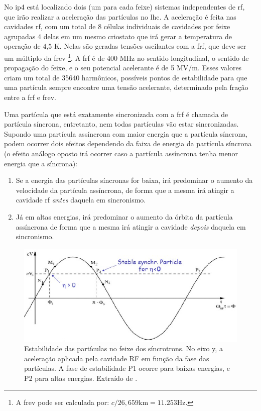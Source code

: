 No \gls{ip}4 está localizado dois (um para cada feixe) sistemas independentes de \gls{rf}, 
que irão realizar a aceleração das partículas no \gls{lhc}. A
aceleração é feita nas cavidades \gls{rf}, com um total de 8 células individuais 
de cavidades por feixe agrupadas 4 delas em um mesmo criostato 
que irá gerar a temperatura de operação de 4,5 K. Nelas são geradas tensões oscilantes
com a \gls{frf}, que deve ser um múltiplo da \gls{frev}
\footnote{A \gls{frev} pode ser calculada por: $c/26,659\text{km}=11.253
\text{Hz}$.}.  A \gls{frf} é de 400 MHz no sentido longitudinal, 
o sentido de propagação do feixe, e o seu potencial acelerante é de 5 MV/m.
Esses valores criam um total de 35640
harmônicos, possíveis pontos de estabilidade para que uma partícula 
sempre encontre uma tensão acelerante, determinado
pela fração entre a \gls{frf} e \gls{frev}. 

Uma partícula que está exatamente
sincronizada com a \gls{frf} é chamada de partícula síncrona, entretanto,
nem todas partículas vão estar sincronizadas. Supondo uma partícula assíncrona com maior
energia que a partícula síncrona, podem ocorrer dois efeitos dependendo da faixa
de energia da partícula síncrona (o efeito análogo oposto irá 
ocorrer caso a partícula assíncrona tenha menor energia que a síncrona):

\begin{enumerate}
\item Se a energia das partículas síncronas for baixa, irá predominar 
o aumento da velocidade da partícula assíncrona, de forma que a mesma irá
atingir a cavidade \gls{rf} \textit{antes} daquela em sincronismo.
\item Já em altas energias, irá predominar o aumento da órbita da partícula
assíncrona de forma que a mesma irá atingir a cavidade \textit{depois}
daquela em sincronismo.
\end{enumerate}

\begin{figure}[h!t]
\centering
\includegraphics[width=.7\textwidth]{imagens/estabilidade_fase.png}
\caption[Estabilidade das partículas no feixe dos síncrotrons]{Estabilidade das partículas no feixe dos síncrotrons. No eixo y, a
aceleração aplicada pela cavidade RF em função da fase das partículas. 
A fase de estabilidade P1 ocorre para baixas energias, e P2 para altas energias. 
Extraído de \cite{lecture_slides_1}.}
\label{fig:est_sinc}
\end{figure}

